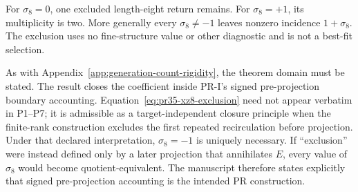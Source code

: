 For $\sigma_8=0$, one excluded length-eight return remains.  For $\sigma_8=+1$, its multiplicity is two.  More generally every $\sigma_8\ne-1$ leaves nonzero incidence $1+\sigma_8$.  The exclusion uses no fine-structure value or other diagnostic and is not a best-fit selection.

As with Appendix~\ref{app:generation-count-rigidity}, the theorem domain must be stated.  The result closes the coefficient inside PR-I's signed pre-projection boundary accounting.  Equation~\eqref{eq:pr35-xz8-exclusion} need not appear verbatim in P1--P7; it is admissible as a target-independent closure principle when the finite-rank construction excludes the first
repeated recirculation before projection.  Under that declared interpretation, $\sigma_8=-1$ is uniquely necessary.  If ``exclusion'' were instead defined only by a later projection that annihilates $E$, every value of $\sigma_8$ would become quotient-equivalent.  The manuscript therefore states explicitly that signed pre-projection accounting is the intended PR construction.
